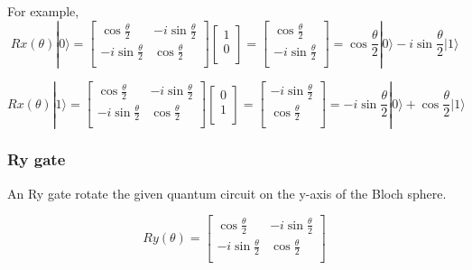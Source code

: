  For example,
 \begin{equation}
 Rx(\theta)|0\rangle = \begin{bmatrix}
\cos{\frac{\theta}{2}} & -i\sin{\frac{\theta}{2}} \\
 -i\sin{\frac{\theta}{2}} & \cos{\frac{\theta}{2}}  \\
\end{bmatrix}\left[
\begin{array}{c}
1 \\
0 \\
\end{array}
\right]
=  \left[
\begin{array}{c}
\cos{\frac{\theta}{2}} \\
-i\sin{\frac{\theta}{2}} \\
\end{array}
\right]
= \cos{\frac{\theta}{2}}|0\rangle -i \sin{\frac{\theta}{2}} |1\rangle
\end{equation}

\begin{equation}
Rx(\theta)|1\rangle = \begin{bmatrix}
\cos{\frac{\theta}{2}} & -i\sin{\frac{\theta}{2}} \\
 -i\sin{\frac{\theta}{2}} & \cos{\frac{\theta}{2}}  \\
\end{bmatrix}\left[
\begin{array}{c}
0 \\
1 \\
\end{array}
\right]
=  \left[
\begin{array}{c}
 -i\sin{\frac{\theta}{2}} \\
\cos{\frac{\theta}{2}}\\
\end{array}
\right]
=-i \sin{\frac{\theta}{2}}|0\rangle + \cos{\frac{\theta}{2}}|1\rangle
\end{equation}

\subsubsection{Ry gate}

 An Ry gate rotate the given quantum circuit on the y-axis of the Bloch sphere.
 
 \begin{equation}
 Ry(\theta) = \begin{bmatrix}
\cos{\frac{\theta}{2}} & -i\sin{\frac{\theta}{2}} \\
 -i\sin{\frac{\theta}{2}} & \cos{\frac{\theta}{2}}  \\
\end{bmatrix}
\end{equation}

